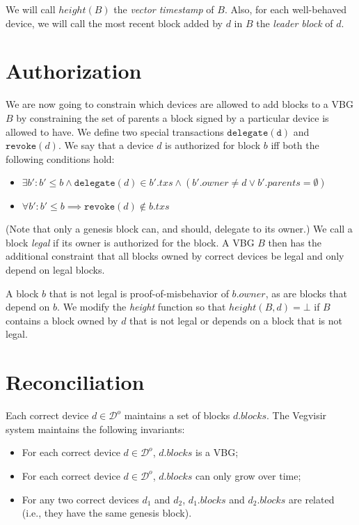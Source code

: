 \documentclass{article}
\begin{document}
We will call $\mathit{height}(B)$ the \emph{vector timestamp} of $B$.
Also, for each well-behaved device, we will call the most recent block added by $d$ in $B$ the
\emph{leader block} of $d$.

\section*{Authorization}

We are now going to constrain which devices are allowed to add blocks to a VBG $B$ by constraining
the set of parents a block signed by a particular device is allowed to have.
We define two special transactions $\mathtt{delegate(d)}$ and $\mathtt{revoke}(d)$.
We say that a device $d$ is authorized for block $b$ iff both the following
conditions hold:
\begin{itemize}
\item $\exists b': b' \leq b \wedge \mathtt{delegate}(d) \in b'.\mathit{txs} \wedge (b'.\mathit{owner} \ne d \vee b'.\mathit{parents} = \emptyset)$
\item $\forall b': b' \leq b \implies \mathtt{revoke}(d) \notin b.\mathit{txs}$
\end{itemize}
(Note that only a genesis block can, and should, delegate to its owner.)
We call a block \emph{legal} if its owner is authorized for the block.
A VBG $B$ then has the additional constraint that all blocks owned by correct devices be legal and
only depend on legal blocks.

A block $b$ that is not legal is proof-of-misbehavior of $b.\mathit{owner}$,
as are blocks that depend on $b$.
We modify the \textit{height} function so
that $\mathit{height}(B, d) = \bot$ if $B$ contains a block owned by $d$ that is not legal
or depends on a block that is not legal.

\section*{Reconciliation}

Each correct device $d \in \mathcal{D}^o$ maintains a set of blocks $d.\mathit{blocks}$.
The Vegvisir system maintains the following invariants:

\begin{itemize}
\item For each correct device $d \in \mathcal{D}^o$, $d.\mathit{blocks}$ is a VBG;
\item For each correct device $d \in \mathcal{D}^o$, $d.\mathit{blocks}$ can only grow over time;
\item For any two correct devices $d_1$ and $d_2$, $d_1.\mathit{blocks}$ and $d_2.\mathit{blocks}$ are related (i.e., they have the same genesis block).
\end{itemize}
\end{document}
